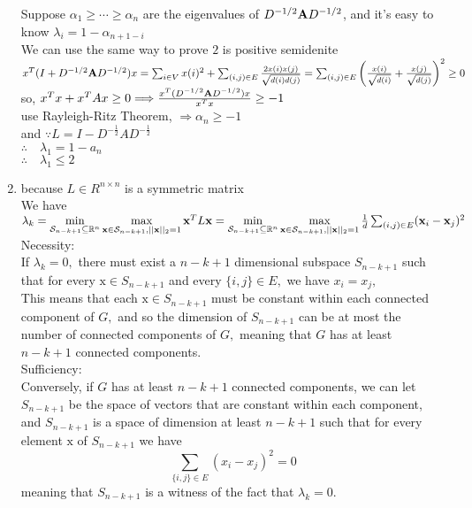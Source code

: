 \documentclass[english,onecolumn]{IEEEtran}
\newcommand{\Rbb}{\mathbb{R}}
\newcommand{\bigS}{\mathcal{S}}
\newcommand{\bA}{{\bf A}}
\newcommand{\bx}{{\bf x}}
\begin{document}
\begin{enumerate}
    Suppose $\alpha_{1} \geq \cdots \geq \alpha_{n}$ are the eigenvalues of $D^{-1 / 2}\bA D^{-1 / 2}$, and it's easy to know $\lambda_{i}=1-\alpha_{n+1-i}$\\
    We can use the same way to prove $2$ is positive semidenite\\
    $x^{T}(I+D^{-1 / 2}\bA D^{-1 / 2}) x=\sum_{i \in V} x(i)^{2}+\sum_{(i, j) \in E} \frac{2 x(i) x(j)}{\sqrt{d(i) d(j)}}=
    \sum_{(i, j) \in E}\left(\frac{x(i)}{\sqrt{d(i)}}+\frac{x(j)}{\sqrt{d(j)}}\right)^{2} \geq 0$\\
    so, $x^{T} x+x^{T} A x \geq 0 \Longrightarrow \frac{x^{T} (D^{-1 / 2}\bA D^{-1 / 2}) x}{x^{T} x} \geq-1$ \\
    use Rayleigh-Ritz Theorem, $\Longrightarrow \alpha_{n} \geq-1$\\
    and $\because L=I-D^{-\frac{1}{2}} A D^{-\frac{1}{2}}$\\
    $\therefore \quad \lambda_{1}=1-a_{n}$\\
    $\therefore \quad \lambda_{1} \leq 2$\\    
    
    \item
    because $L\in R^{n\times n}$ is a symmetric matrix\\
    We have $\lambda_k= \min\limits_{\bigS_{n-k+1}\subseteq \Rbb^n}\max\limits_{\bx\in\bigS_{n-k+1},||\bx||_2=1} \bx^T L\bx=\min\limits_{\bigS_{n-k+1}\subseteq \Rbb^n}\max\limits_{\bx\in\bigS_{n-k+1},||\bx||_2=1}\frac{1}{d}\sum_{(i,j)\in E}(\bx_i-\bx_j)^2 $\\
        
    Necessity:\\ 
    If $\lambda_{k}=0,$ there must exist a $n-k+1$ dimensional subspace $S_{n-k+1}$ such that for every $\mathrm{x} \in S_{n-k+1}$ and every $\{i, j\} \in E,$ we have $x_{i}=x_{j},$\\ 
    This means that each $\mathrm{x} \in S_{n-k+1}$ must be constant within each connected component of $G,$ and so the dimension of $S_{n-k+1}$ can be at most the number of connected components of $G,$ meaning that $G$ has at least $n-k+1$ connected components.\\
    
    Sufficiency:\\ 
    Conversely, if $G$ has at least $n-k+1$ connected components, we can let $S_{n-k+1}$ be the space of vectors that are constant within each component, and $S_{n-k+1}$ is a space of dimension at least $n-k+1$ such that for every element $\mathrm{x}$ of $S_{n-k+1}$ we have
    $$
    \sum_{\{i, j\} \in E}\left(x_{i}-x_{j}\right)^{2}=0
    $$
    meaning that $S_{n-k+1}$ is a witness of the fact that $\lambda_{k}=0$.
    
    
    
    
\end{enumerate}
\end{document}
